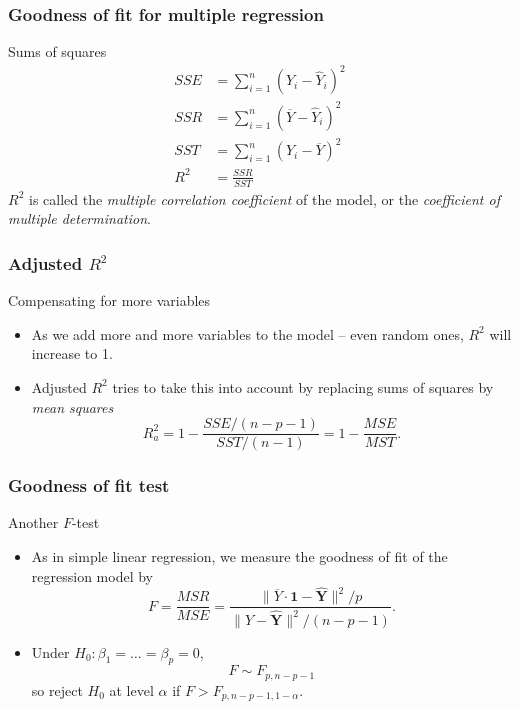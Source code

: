 \documentclass[handout]{beamer}
\begin{document}

   \begin{frame} \frametitle{Goodness of fit for multiple regression}

   \begin{block}
   {Sums of squares}
   $$
   \begin{aligned}
   SSE &= \sum_{i=1}^n(Y_i - \widehat{Y}_i)^2 \\
   SSR &= \sum_{i=1}^n(\overline{Y} - \widehat{Y}_i)^2 \\
   SST &= \sum_{i=1}^n(Y_i - \overline{Y})^2 \\
   R^2 &= \frac{SSR}{SST}
   \end{aligned}
   $$
   $R^2$ is called the {\em multiple correlation coefficient} of the model, or
   the {\em coefficient of multiple determination}.
   \end{block}
   \end{frame}


   \begin{frame} \frametitle{Adjusted $R^2$}

   \begin{block}
   {Compensating for more variables}
   \begin{itemize}

   \item As we add more and more variables to the model -- even random ones, $R^2$ will increase to 1.

   \item Adjusted $R^2$ tries to take this into account by replacing
   sums of squares by {\em mean squares}
   $$
   R^2_a = 1 - \frac{SSE/(n-p-1)}{SST/(n-1)} = 1 - \frac{MSE}{MST}.$$
   \end{itemize}
   \end{block}
   \end{frame}


   \begin{frame} \frametitle{Goodness of fit test}

   \begin{block}
   {Another $F$-test}
   \begin{itemize}
   \item As in simple linear regression, we measure the goodness of fit
   of the regression model by
   $$
   F = \frac{MSR}{MSE} = \frac{\|\overline{Y}\cdot \pmb{1} - \widehat{\pmb{Y}}\|^2/p}{\|Y - \widehat{\pmb{Y}}\|^2/(n-p-1)}.$$

   \item Under $H_0:\beta_1 = \dots = \beta_p=0$,
   $$
   F \sim F_{p, n-p-1}$$
   so reject $H_0$ at level $\alpha$ if $F > F_{p,n-p-1,1-\alpha}.$
   \end{itemize}
   \end{block}
   \end{frame}
\end{document}
